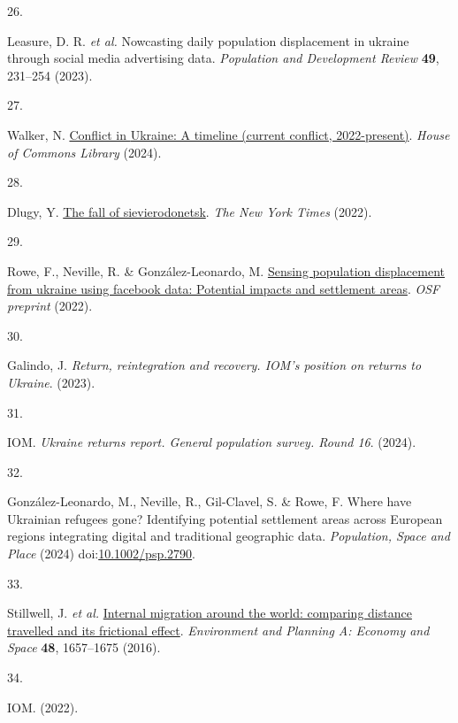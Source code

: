 \documentclass[
  11pt,
]{article}
\newlength{\cslhangindent}
\newlength{\csllabelwidth}
\newenvironment{CSLReferences}[2] %
 {\begin{list}{}{%
  \setlength{\itemindent}{0pt}
  \setlength{\leftmargin}{0pt}
  \setlength{\parsep}{0pt}
  \ifodd #1
   \setlength{\leftmargin}{\cslhangindent}
   \setlength{\itemindent}{-1\cslhangindent}
  \fi
  \setlength{\itemsep}{#2\baselineskip}}}
 {\end{list}}
\newcommand{\CSLLeftMargin}[1]{\parbox[t]{\csllabelwidth}{\strut#1\strut}}
\newcommand{\CSLRightInline}[1]{\parbox[t]{\linewidth - \csllabelwidth}{\strut#1\strut}}
\begin{document}
\begin{CSLReferences}{0}{0}
\CSLLeftMargin{26. }%
\CSLRightInline{Leasure, D. R. \emph{et al.} Nowcasting daily population
displacement in ukraine through social media advertising data.
\emph{Population and Development Review} \textbf{49}, 231--254 (2023).}

\CSLLeftMargin{27. }%
\CSLRightInline{Walker, N.
\href{https://commonslibrary.parliament.uk/research-briefings/cbp-9847/}{Conflict
in {Ukraine: A} timeline (current conflict, 2022-present)}. \emph{{House
of Commons Library}} (2024).}

\CSLLeftMargin{28. }%
\CSLRightInline{Dlugy, Y.
\href{https://www.nytimes.com/2022/06/24/briefing/russia-ukraine-war-sievierodonetsk-romania.html}{The
fall of sievierodonetsk}. \emph{{The New York Times}} (2022).}

\CSLLeftMargin{29. }%
\CSLRightInline{Rowe, F., Neville, R. \& González-Leonardo, M.
\href{http://dx.doi.org/10.31219/osf.io/7n6wm}{Sensing population
displacement from ukraine using facebook data: Potential impacts and
settlement areas}. \emph{OSF preprint} (2022).}

\CSLLeftMargin{30. }%
\CSLRightInline{Galindo, J. \emph{{Return, reintegration and recovery.
IOM's position on returns to Ukraine}}. (2023).}

\CSLLeftMargin{31. }%
\CSLRightInline{IOM. \emph{{Ukraine returns report. General population
survey. Round 16}}. (2024).}

\CSLLeftMargin{32. }%
\CSLRightInline{González-Leonardo, M., Neville, R., Gil-Clavel, S. \&
Rowe, F. Where have Ukrainian refugees gone? Identifying potential
settlement areas across European regions integrating digital and
traditional geographic data. \emph{Population, Space and Place} (2024)
doi:\href{https://doi.org/10.1002/psp.2790}{10.1002/psp.2790}.}

\CSLLeftMargin{33. }%
\CSLRightInline{Stillwell, J. \emph{et al.}
\href{https://doi.org/10.1177/0308518x16643963}{Internal migration
around the world: comparing distance travelled and its frictional
effect}. \emph{Environment and Planning A: Economy and Space}
\textbf{48}, 1657--1675 (2016).}

\CSLLeftMargin{34. }%
\CSLRightInline{IOM. (2022).}


\end{CSLReferences}
\end{document}
